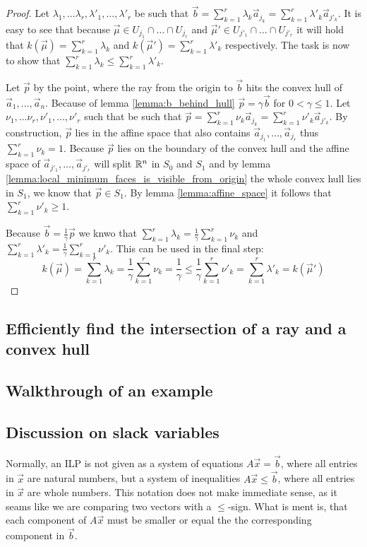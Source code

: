 \begin{proof}
    Let $\lambda_1, \dots \lambda_r, \lambda'_1, \dots, \lambda'_r$ be such that $\vec b = \sum_{k=1}^{r}\lambda_k \vec a_{j_k} = \sum_{k=1}^{r}\lambda'_k \vec a_{j'_k}$. It is easy to see that because $\vec\mu \in U_{j_1} \cap \dots \cap U_{j_r}$ and $\vec\mu' \in U_{j'_1} \cap \dots \cap U_{j'_r}$ it will hold that $k(\vec\mu) = \sum_{k=1}^{r}\lambda_k$ and $k(\vec\mu') = \sum_{k=1}^{r}\lambda'_k$ respectively. The task is now to show that $\sum_{k=1}^{r}\lambda_k \leq \sum_{k=1}^{r}\lambda'_k$.

    Let $\vec p$ by the point, where the ray from the origin to $\vec b$ hits the convex hull of $\vec a_1, \dots, \vec a_n$. Because of lemma \ref{lemma:b_behind_hull} $\vec p = \gamma\vec b$ for $0 < \gamma \leq 1$. Let $\nu_1, \dots \nu_r, \nu'_1, \dots, \nu'_r$ such that be such that $\vec p = \sum_{k=1}^{r}\nu_k \vec a_{j_k} = \sum_{k=1}^{r}\nu'_k \vec a_{j'_k}$. By construction, $\vec p$ lies in the affine space that also contains $\vec a_{j_1}, \dots, \vec a_{j_r}$ thus $\sum_{k=1}^{r}\nu_k = 1$. Because $\vec p$ lies on the boundary of the convex hull and the affine space of $\vec a_{j'_1}, \dots, \vec a_{j'_r}$ will split $\mathbb{R}^n$ in $S_0$ and $S_1$ and by lemma \ref{lemma:local_minimum_faces_is_visible_from_origin} the whole convex hull lies in $S_1$, we know that $\vec p\in S_1$. By lemma \ref{lemma:affine_space} it follows that $\sum_{k=1}^{r}\nu'_k \geq 1$.

    Because $\vec b = \frac{1}{\gamma}\vec p$ we knwo that $\sum_{k=1}^{r}\lambda_k = \frac{1}{\gamma} \sum_{k=1}^{r}\nu_k$ and $\sum_{k=1}^{r}\lambda'_k = \frac{1}{\gamma} \sum_{k=1}^{r}\nu'_k$. This can be used in the final step:
    $$k(\vec\mu) = \sum_{k=1}^{r}\lambda_k = \frac{1}{\gamma} \sum_{k=1}^{r}\nu_k = \frac{1}{\gamma} \leq \frac{1}{\gamma} \sum_{k=1}^{r}\nu'_k = \sum_{k=1}^{r}\lambda'_k = k(\vec\mu')$$
\end{proof}

\subsection{Efficiently find the intersection of a ray and a convex hull}


\subsection{Walkthrough of an example}

\subsection{Discussion on slack variables}
Normally, an ILP is not given as a system of equations $A\vec x = \vec b$, where all entries in $\vec x$ are natural numbers, but a system of inequalities $A\vec x \leq \vec b$, where all entries in $\vec x$ are whole numbers. This notation does not make immediate sense, as it seams like we are comparing two vectors with a $\leq$-sign. What is ment is, that each component of $A\vec x$ must be smaller or equal the the corresponding component in $\vec b$. 

